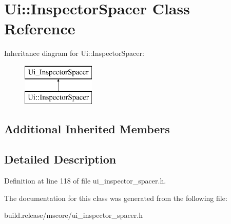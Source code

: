 \hypertarget{class_ui_1_1_inspector_spacer}{}\section{Ui\+:\+:Inspector\+Spacer Class Reference}
\label{class_ui_1_1_inspector_spacer}
Inheritance diagram for Ui\+:\+:Inspector\+Spacer\+:\begin{figure}[H]
\begin{center}
\leavevmode
\includegraphics[height=2.000000cm]{class_ui_1_1_inspector_spacer}
\end{center}
\end{figure}
\subsection*{Additional Inherited Members}


\subsection{Detailed Description}


Definition at line 118 of file ui\+\_\+inspector\+\_\+spacer.\+h.



The documentation for this class was generated from the following file\+:\begin{DoxyCompactItemize}
\item 
build.\+release/mscore/ui\+\_\+inspector\+\_\+spacer.\+h\end{DoxyCompactItemize}
